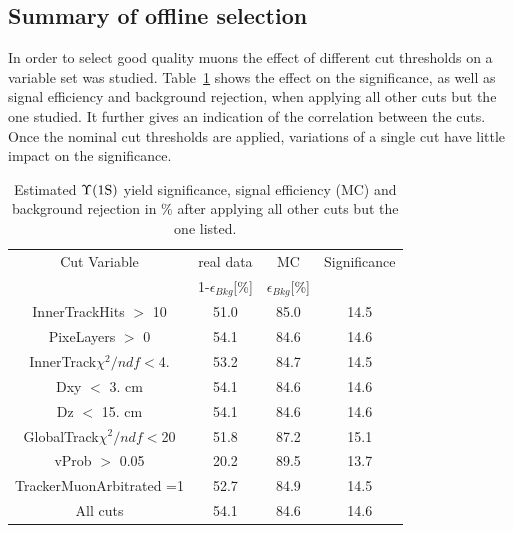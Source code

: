 \subsection{Summary of offline selection}

In order to select good quality muons the effect of different cut thresholds on a variable set was studied. 
Table~\ref{tab:Efficiency_cuts_all} shows the effect on the significance, as well as signal efficiency and background rejection, when applying all other cuts but the one studied. %
It further gives an indication of the correlation between the cuts. 
Once the nominal cut thresholds are applied, variations of a single cut have little impact on the significance. 
\begin{table}[h!]
\begin{center}  
\caption{Estimated $\Upsilon\text{(1S)}$ yield significance, signal efficiency (MC) and background rejection in \% after applying all other cuts but the one listed.}
   \vspace{1em}
  \label{tab:Efficiency_cuts_all}
\begin{tabular}{c|c|c|c}
\hline
Cut Variable   &real data                   &MC                     &Significance \\ 
               &1-$\epsilon_{Bkg}$[\%]       &$\epsilon_{Bkg}$[\%]     & \\
\hline
 InnerTrackHits $>$ 10                       &51.0 &85.0 &14.5 \\  
 PixeLayers       $>$ 0                      &54.1  &84.6  &14.6 \\
 InnerTrack$\chi^2/ndf<$4.                   &53.2  &84.7  &14.5 \\
 Dxy    $<$ 3. cm                            &54.1  &84.6  &14.6 \\
 Dz       $<$ 15.  cm                        &54.1  &84.6  &14.6 \\
 GlobalTrack$\chi^2/ndf<$20                  &51.8  &87.2  &15.1 \\
 vProb $>$ 0.05                              &20.2  &89.5  &13.7\\ 
 TrackerMuonArbitrated =1                    &52.7  &84.9  &14.5\\ \hline
 All cuts                                    &54.1  &84.6  &14.6\\ \hline
\end{tabular}
\end{center}
\end{table}


